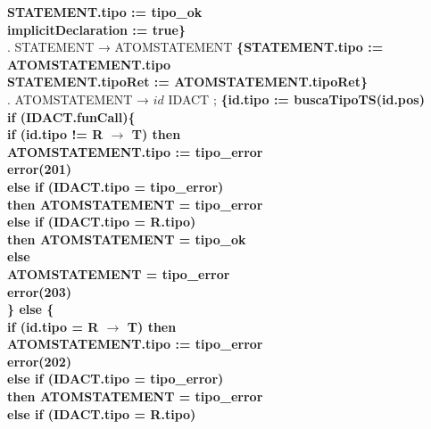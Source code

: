 \begin{tabbing}
    \>              \>          \>\textbf{STATEMENT.tipo := tipo\_ok}\\
    \>              \> \textbf{implicitDeclaration := true\}}\\
    . STATEMENT → ATOMSTATEMENT \textbf{\{STATEMENT.tipo := ATOMSTATEMENT.tipo}\\
    \>                    \> \textbf{STATEMENT.tipoRet := ATOMSTATEMENT.tipoRet\}}\\
    . ATOMSTATEMENT → $id$ IDACT ; \textbf{\{id.tipo := buscaTipoTS(id.pos)}\\
    \>              \> \textbf{if (IDACT.funCall)\{}\\
    \>              \>          \> \textbf{if (id.tipo != R $\rightarrow$ T) then}\\
    \>              \>          \>      \> \textbf{ATOMSTATEMENT.tipo := tipo\_error}\\
    \>              \>          \>      \> \textbf{error(201)}\\
    \>              \>          \> \textbf{else if (IDACT.tipo = tipo\_error)}\\
    \>              \>          \>      \> \textbf{then ATOMSTATEMENT = tipo\_error}\\
    \>              \>          \> \textbf{else if (IDACT.tipo = R.tipo)}\\
    \>              \>          \>      \> \textbf{then ATOMSTATEMENT = tipo\_ok}\\
    \>              \>          \> \textbf{else}\\
    \>              \>          \>      \> \textbf{ATOMSTATEMENT = tipo\_error}\\
    \>              \>          \>      \> \textbf{error(203)}\\
    \>              \> \textbf{\} else \{}\\
    \>              \>          \> \textbf{if (id.tipo = R $\rightarrow$ T) then}\\
    \>              \>          \>      \> \textbf{ATOMSTATEMENT.tipo := tipo\_error}\\
    \>              \>          \>      \> \textbf{error(202)}\\
    \>              \>          \> \textbf{else if (IDACT.tipo = tipo\_error)}\\
    \>              \>          \>      \> \textbf{then ATOMSTATEMENT = tipo\_error}\\
    \>              \>          \> \textbf{else if (IDACT.tipo = R.tipo)}\\

\end{tabbing}

